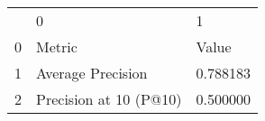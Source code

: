 \begin{tabular}{lll}
 & 0 & 1 \\
0 & Metric & Value \\
1 & Average Precision & 0.788183 \\
2 & Precision at 10 (P@10) & 0.500000 \\
\end{tabular}
